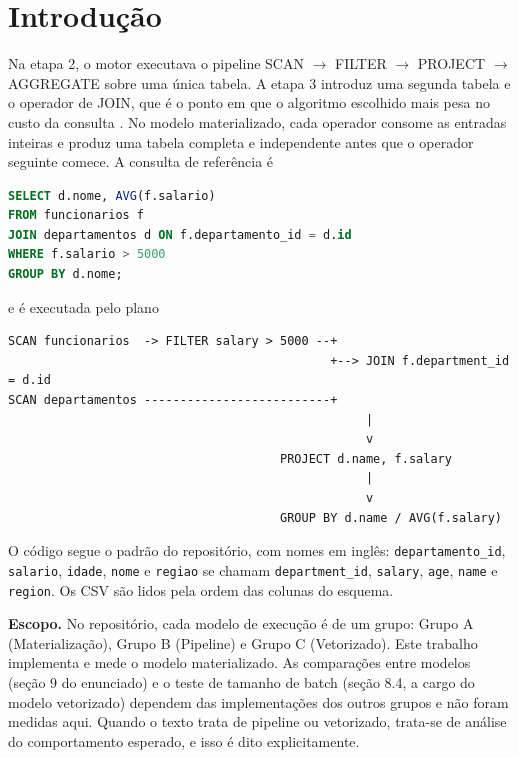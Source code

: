 \documentclass[11pt,a4paper]{article}
\begin{document}
\section{Introdução}
Na etapa 2, o motor executava o pipeline SCAN $\rightarrow$ FILTER $\rightarrow$ PROJECT $\rightarrow$ AGGREGATE sobre uma única tabela. A etapa 3 introduz uma segunda tabela e o operador de JOIN, que é o ponto em que o algoritmo escolhido mais pesa no custo da consulta \cite{graefe,garcia}. No modelo materializado, cada operador consome as entradas inteiras e produz uma tabela completa e independente antes que o operador seguinte comece. A consulta de referência é
\par\medskip\noindent\begin{minipage}{\linewidth}
\begin{lstlisting}[language=SQL]
SELECT d.nome, AVG(f.salario)
FROM funcionarios f
JOIN departamentos d ON f.departamento_id = d.id
WHERE f.salario > 5000
GROUP BY d.nome;
\end{lstlisting}
\end{minipage}\par\medskip
\noindent e é executada pelo plano
\par\medskip\noindent\begin{minipage}{\linewidth}
\begin{lstlisting}[columns=fixed,basicstyle=\ttfamily\footnotesize]
SCAN funcionarios  -> FILTER salary > 5000 --+
                                             +--> JOIN f.department_id = d.id
SCAN departamentos --------------------------+
                                                  |
                                                  v
                                      PROJECT d.name, f.salary
                                                  |
                                                  v
                                      GROUP BY d.name / AVG(f.salary)
\end{lstlisting}
\end{minipage}\par\medskip
O código segue o padrão do repositório, com nomes em inglês: \texttt{departamento\_id}, \texttt{salario}, \texttt{idade}, \texttt{nome} e \texttt{regiao} se chamam \texttt{department\_id}, \texttt{salary}, \texttt{age}, \texttt{name} e \texttt{region}. Os CSV são lidos pela ordem das colunas do esquema.

\textbf{Escopo.} No repositório, cada modelo de execução é de um grupo: Grupo A (Materialização), Grupo B (Pipeline) e Grupo C (Vetorizado). Este trabalho implementa e mede o modelo materializado. As comparações entre modelos (seção 9 do enunciado) e o teste de tamanho de batch (seção 8.4, a cargo do modelo vetorizado) dependem das implementações dos outros grupos e não foram medidas aqui. Quando o texto trata de pipeline ou vetorizado, trata-se de análise do comportamento esperado, e isso é dito explicitamente.
\end{document}
